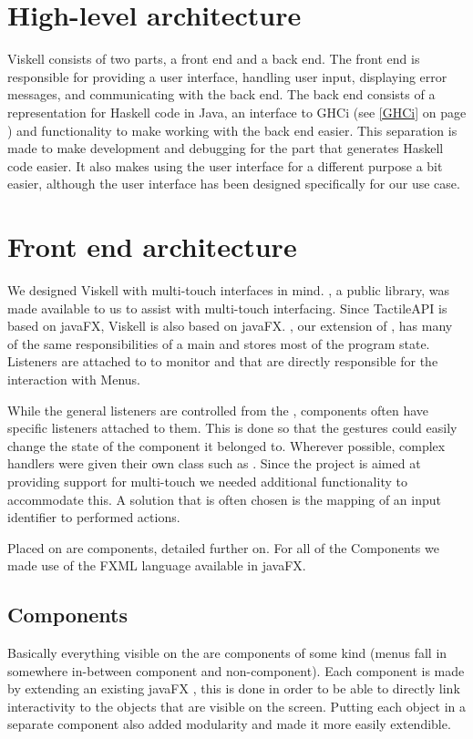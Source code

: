 \section{High-level architecture}
Viskell consists of two parts, a front end and a back end.  
The front end is responsible for providing a user interface, handling user input, displaying error messages, and communicating with the back end.
The back end consists of a representation for Haskell code in Java, an interface to GHCi (see \ref{GHCi} on page \pageref{GHCi}) and functionality to make working with the back end easier.
This separation is made to make development and debugging for the part that generates Haskell code easier.
It also makes using the user interface for a different purpose a bit easier, although the user interface has been designed specifically for our use case.

\section{Front end architecture}
We designed Viskell with multi-touch interfaces in mind. , a public library, was made available to us to assist with multi-touch interfacing. Since TactileAPI is based on javaFX, Viskell is also based on javaFX. , our extension of , has many of the same responsibilities of a main  and stores most of the program state.
Listeners are attached to  to monitor  and  that are directly responsible for the interaction with Menus.

While the general listeners are controlled from the , components often have specific listeners attached to them.
This is done so that the gestures could easily change the state of the component it belonged to. Wherever possible, complex handlers were given their own class such as . Since the project is aimed at providing support for multi-touch we needed additional functionality to accommodate this. A solution that is often chosen is the mapping of an input identifier to performed actions.

Placed on  are components, detailed further on. For all of the Components we made use of the FXML language available in javaFX.

\subsection{Components}
Basically everything visible on the  are components of some kind (menus fall in somewhere in-between component and non-component).
Each component is made by extending an existing javaFX , this is done in order to be able to directly link interactivity to the objects that are visible on the screen.
Putting each object in a separate component also added modularity and made it more easily extendible.

